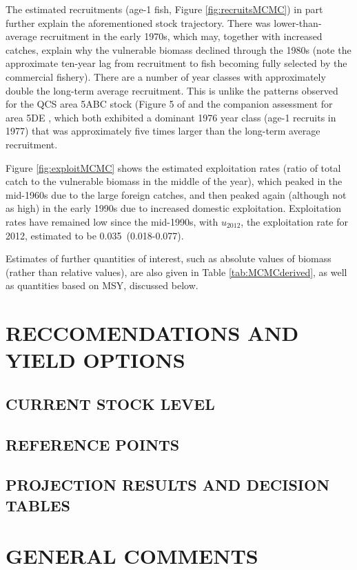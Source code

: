The estimated recruitments (age-1 fish, Figure \ref{fig:recruitsMCMC}) in part further explain the aforementioned stock trajectory. There was lower-than-average recruitment in the early 1970s, which may, together with increased catches, explain why the vulnerable biomass declined through the 1980s (note the approximate ten-year lag from recruitment to fish becoming fully selected by the commercial fishery). There are a number of year classes with approximately double the long-term average recruitment. This is unlike the patterns observed for the QCS area 5ABC stock (Figure 5 of  and the companion assessment for area 5DE , which both exhibited a dominant 1976 year class (age-1 recruits in 1977) that was approximately five times larger than the long-term average recruitment.

Figure \ref{fig:exploitMCMC} shows the estimated exploitation rates (ratio of total catch to the vulnerable biomass in the middle of the year), which peaked in the mid-1960s due to the large foreign catches, and then peaked again (although not as high) in the early 1990s due to increased domestic exploitation. Exploitation rates have remained low since the mid-1990s, with $u_{2012}$, the exploitation rate for 2012, estimated to be 0.035~(0.018-0.077).

Estimates of further quantities of interest, such as absolute values of biomass (rather than relative values), are also given in Table \ref{tab:MCMCderived}, as well as quantities based on MSY, discussed below.

\section{RECCOMENDATIONS AND YIELD OPTIONS}

\subsection{CURRENT STOCK LEVEL}

\subsection{REFERENCE POINTS}

\subsection{PROJECTION RESULTS AND DECISION TABLES}

\section{GENERAL COMMENTS}


